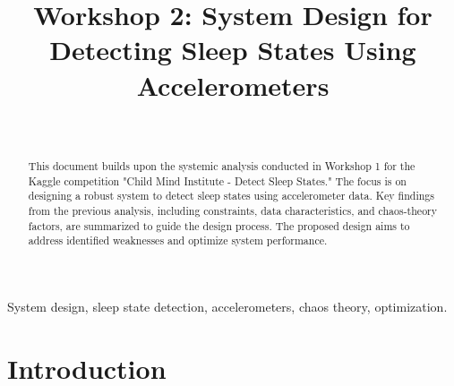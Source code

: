 \documentclass[conference]{IEEEtran}
\begin{document}
\title{Workshop 2: System Design for Detecting Sleep States Using Accelerometers}

\author{
	\\
	\and
}

\maketitle

\begin{abstract}
	This document builds upon the systemic analysis conducted in Workshop 1 for the Kaggle competition "Child Mind Institute - Detect Sleep States." The focus is on designing a robust system to detect sleep states using accelerometer data. Key findings from the previous analysis, including constraints, data characteristics, and chaos-theory factors, are summarized to guide the design process. The proposed design aims to address identified weaknesses and optimize system performance.
\end{abstract}

\begin{IEEEkeywords}
	System design, sleep state detection, accelerometers, chaos theory, optimization.
\end{IEEEkeywords}

\section{Introduction}
\end{document}
